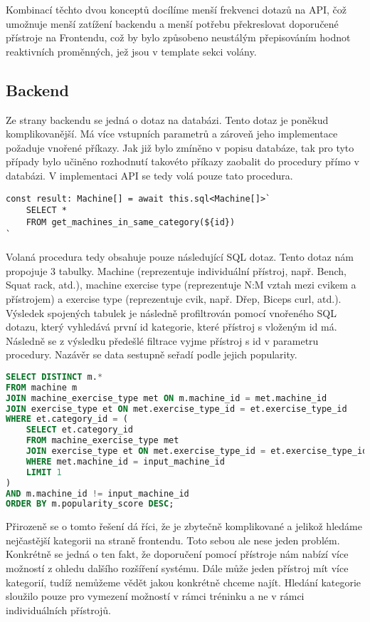 Kombinací těchto dvou konceptů docílíme menší frekvenci dotazů na API, čož umožnuje menší zatížení backendu a menší potřebu překreslovat doporučené přístroje na Frontendu, což by bylo způsobeno neustálým přepisováním hodnot reaktivních proměnných, jež jsou v template sekci volány.

\subsection{Backend}
Ze strany backendu se jedná o dotaz na databázi. Tento dotaz je poněkud komplikovanější. Má více vstupních parametrů a zároveň jeho implementace požaduje vnořené příkazy. Jak již bylo zmíněno v popisu databáze, tak pro tyto případy bylo učiněno rozhodnutí takovéto příkazy zaobalit do procedury přímo v databázi. V implementaci API se tedy volá pouze tato procedura.

\begin{lstlisting}
const result: Machine[] = await this.sql<Machine[]>`
    SELECT * 
    FROM get_machines_in_same_category(${id})
`
\end{lstlisting}

Volaná procedura tedy obsahuje pouze následující SQL dotaz. Tento dotaz nám propojuje 3 tabulky. Machine (reprezentuje individuální přístroj, např. Bench, Squat rack, atd.), machine exercise type (reprezentuje N:M vztah mezi cvikem a přístrojem) a exercise type (reprezentuje cvik, např. Dřep, Biceps curl, atd.). Výsledek spojených tabulek je následně profiltrován pomocí vnořeného SQL dotazu, který vyhledává první id kategorie, které přístroj s vloženým id má. Následně se z výsledku předešlé filtrace vyjme přístroj s id v parametru procedury. Nazávěr se data sestupně seřadí podle jejich popularity.

\begin{lstlisting}[language=SQL]
SELECT DISTINCT m.*
FROM machine m
JOIN machine_exercise_type met ON m.machine_id = met.machine_id
JOIN exercise_type et ON met.exercise_type_id = et.exercise_type_id
WHERE et.category_id = (
    SELECT et.category_id
    FROM machine_exercise_type met
    JOIN exercise_type et ON met.exercise_type_id = et.exercise_type_id
    WHERE met.machine_id = input_machine_id
    LIMIT 1
)
AND m.machine_id != input_machine_id
ORDER BY m.popularity_score DESC;
\end{lstlisting}
Přirozeně se o tomto řešení dá říci, že je zbytečně komplikované a jelikož hledáme nejčastější kategorii na straně frontendu. Toto sebou ale nese jeden problém. Konkrétně se jedná o ten fakt, že doporučení pomocí přístroje nám nabízí více možností z ohledu dalšího rozšíření systému. Dále může jeden přístroj mít více kategorií, tudíž nemůžeme vědět jakou konkrétně chceme najít. Hledání kategorie sloužilo pouze pro vymezení možností v rámci tréninku a ne v rámci individuálních přístrojů.

